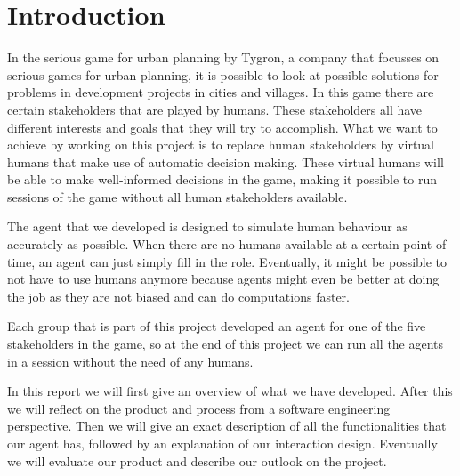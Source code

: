 \section{Introduction}
In the serious game for urban planning by Tygron, a company that focusses on serious games for urban planning, it is possible to look at possible solutions for problems in development projects in cities and villages. In this game there are certain stakeholders that are played by humans. These stakeholders all have different interests and goals that they will try to accomplish. What we want to achieve by working on this project is to replace human stakeholders by virtual humans that make use of automatic decision making. These virtual humans will be able to make well-informed decisions in the game, making it possible to run sessions of the game without all human stakeholders available.

The agent that we developed is designed to simulate human behaviour as accurately as possible. When there are no humans available at a certain point of time, an agent can just simply fill in the role. Eventually, it might be possible to not have to use humans anymore because agents might even be better at doing the job as they are not biased and can do computations faster.

Each group that is part of this project developed an agent for one of the five stakeholders in the game, so at the end of this project we can run all the agents in a session without the need of any humans.

In this report we will first give an overview of what we have developed. After this we will reflect on the product and process from a software engineering perspective. Then we will give an exact description of all the functionalities that our agent has, followed by an explanation of our interaction design. Eventually we will evaluate our product and describe our outlook on the project.
\newpage
